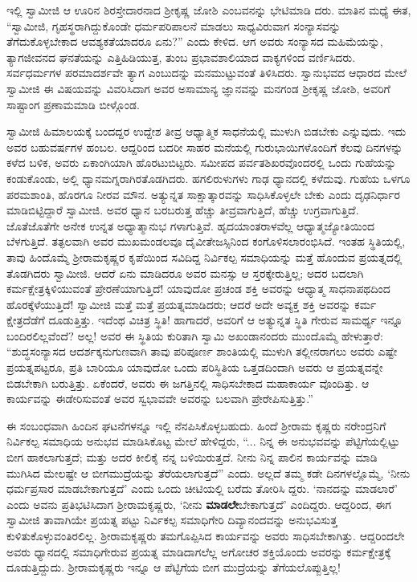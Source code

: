ಇಲ್ಲಿ ಸ್ವಾಮೀಜಿ ಆ ಊರಿನ ಶಿರಸ್ತೇದಾರನಾದ ಶ್ರೀಕೃಷ್ಣ ಜೋಶಿ ಎಂಬವನನ್ನು ಭೇಟಿಮಾಡಿ ದರು. ಮಾತಿನ ಮಧ್ಯೆ ಈತ, “ಸ್ವಾಮೀಜಿ, ಗೃಹಸ್ಥರಾಗಿದ್ದುಕೊಂಡೇ ಧರ್ಮಪರಿಪಾಲನೆ ಮಾಡಲು ಸಾಧ್ಯವಿರುವಾಗ ಸಂನ್ಯಾಸವನ್ನು ತೆಗೆದುಕೊಳ್ಳಬೇಕಾದ ಆವಶ್ಯಕತೆಯಾದರೂ ಏನು?” ಎಂದು ಕೇಳಿದ. ಆಗ ಅವರು ಸಂನ್ಯಾಸದ ಮಹಿಮೆಯನ್ನು, ತ್ಯಾಗಜೀವನದ ಘನತೆಯನ್ನು ಎತ್ತಿಹಿಡಿಯುತ್ತ, ತುಂಬ ಪ್ರಭಾವಶಾಲಿಯಾದ ವಾಕ್ಯಗಳಿಂದ ವರ್ಣಿಸಿದರು. ಸರ್ವಧರ್ಮಗಳ ಪರಮಾದರ್ಶವೇ ತ್ಯಾಗ ಎಂಬುದನ್ನು ಮನಮುಟ್ಟುವಂತೆ ತಿಳಿಸಿದರು. ಸ್ವಾನುಭವದ ಆಧಾರದ ಮೇಲೆ ಸ್ವಾಮೀಜಿ ಈ ವಿಷಯವನ್ನು ವಿವರಿಸಿದಾಗ ಅವರ ಅಸಾಮಾನ್ಯ ಜ್ಞಾನವನ್ನು ಮನಗಂಡ ಶ್ರೀಕೃಷ್ಣ ಜೋಶಿ, ಅವರಿಗೆ ಸಾಷ್ಟಾಂಗ ಪ್ರಣಾಮಮಾಡಿ ಬೀಳ್ಗೊಂಡ.

ಸ್ವಾಮೀಜಿ ಹಿಮಾಲಯಕ್ಕೆ ಬಂದದ್ದರ ಉದ್ದೇಶ ತೀವ್ರ ಆಧ್ಯಾತ್ಮಿಕ ಸಾಧನೆಯಲ್ಲಿ ಮುಳುಗಿ ಬಿಡಬೇಕು ಎನ್ನುವುದು. ಇದು ಅವರ ಬಹುವರ್ಷಗಳ ಹಂಬಲ. ಆದ್ದರಿಂದ ಬದರೀ ಸಾಹರ ಮನೆಯಲ್ಲಿ ಗುರುಭಾಯಿಗಳೊಂದಿಗೆ ಕೆಲವು ದಿನಗಳನ್ನು ಕಳೆದ ಬಳಿಕ, ಅವರು ಏಕಾಂಗಿಯಾಗಿ ಹೊರಟುಬಿಟ್ಟರು. ಸಮೀಪದ ಪರ್ವತಶಿಖರವೊಂದರಲ್ಲಿ ಒಂದು ಗುಹೆಯನ್ನು ಕಂಡುಕೊಂಡು, ಅಲ್ಲಿ ಧ್ಯಾನಮಗ್ನರಾಗಿರತೊಡಗಿದರು. ಹಗಲಿರುಳುಗಳು ಗಾಢ ಧ್ಯಾನದಲ್ಲಿ ಕಳೆದುವು. ಗುಹೆಯ ಒಳಗೂ ಪರಮಶಾಂತಿ, ಹೊರಗೂ ನೀರವ ಮೌನ. ಅತ್ಯುನ್ನತ ಸಾಕ್ಷಾತ್ಕಾರವನ್ನು ಸಾಧಿಸಿಕೊಳ್ಳಲೇ ಬೇಕು ಎಂದು ದೃಢನಿರ್ಧಾರ ಮಾಡಿಬಿಟ್ಟಿದ್ದಾರೆ ಸ್ವಾಮೀಜಿ. ಅವರ ಧ್ಯಾನ ಬರಬರುತ್ತ ಹೆಚ್ಚು ತೀವ್ರವಾಗುತ್ತಿದೆ, ಹೆಚ್ಚು ಉಗ್ರವಾಗುತ್ತಿದೆ. ಜೊತೆಜೊತೆಗೇ ಅನೇಕ ಉನ್ನತ ಅಧ್ಯಾತ್ಮಾನುಭ ಗಳಾಗುತ್ತಿವೆ. ಹೃದಯಾಂತರಾಳವೆಲ್ಲ ಆಧ್ಯಾತ್ಮಜ್ಯೋತಿಯಿಂದ ಬೆಳಗುತ್ತಿದೆ. ತತ್ಫಲವಾಗಿ ಅವರ ಮುಖಮಂಡಲವೂ ದೈವೀತೇಜಸ್ಸಿನಿಂದ ಕಂಗೊಳಿಸಲಾರಂಭಿಸಿದೆ. ಇಂತಹ ಸ್ಥಿತಿಯಲ್ಲಿ, ತಾವು ಹಿಂದೊಮ್ಮೆ ಶ್ರೀರಾಮಕೃಷ್ಣರ ಕೃಪೆಯಿಂದ ಸವಿದಿದ್ದ ನಿರ್ವಿಕಲ್ಪ ಸಮಾಧಿಯನ್ನು ಮತ್ತೆ ಹೊಂದುವ ಪ್ರಯತ್ನದಲ್ಲಿ ತೊಡಗಿದರು ಸ್ವಾಮೀಜಿ. ಆದರೆ ಏನು ಮಾಡಿದರೂ ಅವರ ಮನಸ್ಸು ಆ ಸ್ತರಕ್ಕೇರುತ್ತಿಲ್ಲ; ಅದರ ಬದಲಾಗಿ ಕರ್ಮಕ್ಷೇತ್ರಕ್ಕಿಳಿಯುವಂತೆ ಪ್ರೇರಣೆಯಾಗುತ್ತಿದೆ! ಯಾವುದೋ ಪ್ರಚಂಡ ಶಕ್ತಿ ಅವರನ್ನು ಆಧ್ಯಾತ್ಮ ಸಾಧನಾಪಥದಿಂದ ಹೊರಕ್ಕೆಳೆಯುತ್ತಿದೆ! ಸ್ವಾಮೀಜಿ ಮತ್ತೆ ಮತ್ತೆ ಪ್ರಯತ್ನಮಾಡಿದರು; ಆದರೆ ಅದೇ ಅವ್ಯಕ್ತ ಶಕ್ತಿ ಅವರನ್ನು ಕರ್ಮ ಕ್ಷೇತ್ರದೆಡೆಗೆ ದೂಡುತ್ತಿತ್ತು. ಇದೆಂಥ ವಿಚಿತ್ರ ಸ್ಥಿತಿ! ಹಾಗಾದರೆ, ಅವರಿಗೆ ಆ ಅತ್ಯುನ್ನತ ಸ್ಥಿತಿ ಗೇರುವ ಸಾಮರ್ಥ್ಯ ಇನ್ನೂ ಬಂದಿರಲಿಲ್ಲವೆಂದೆ? ಅಲ್ಲ! ಅವರ ಈ ಸ್ಥಿತಿಯ ಕುರಿತಾಗಿ ಸ್ವಾಮಿ ಅಖಂಡಾನಂದರು ಮುಂದೊಮ್ಮೆ ಹೇಳುತ್ತಾರೆ: “ಶುದ್ಧಸಂನ್ಯಾಸದ ಆದರ್ಶಕ್ಕನುಗುಣವಾಗಿ ತಾವು ಪರಿಪೂರ್ಣ ಶಾಂತಿಯಲ್ಲಿ ಮುಳುಗಿ ತಲ್ಲೀನರಾಗಲು ಅವರು ಎಷ್ಟೇ ಪ್ರಯತ್ನಪಟ್ಟರೂ, ಪ್ರತಿ ಬಾರಿಯೂ ಯಾವುದೋ ಒಂದು ಪರಿಸ್ಥಿತಿಯ ಒತ್ತಡದಿಂದಾಗಿ ಅವರು ಆ ಪ್ರಯತ್ನವನ್ನೇ ಬಿಡಬೇಕಾಗಿ ಬರುತ್ತಿತ್ತು. ಏಕೆಂದರೆ, ಅವರು ಈ ಜಗತ್ತಿನಲ್ಲಿ ಸಾಧಿಸಬೇಕಾದ ಮಹಾಕಾರ್ಯ ವೊಂದಿತ್ತು. ಆ ಕಾರ್ಯವನ್ನು ಈಡೇರಿಸುವಂತೆ ಅವರ ಸ್ವಭಾವವೇ ಅವರನ್ನು ಬಲವಾಗಿ ಪ್ರೇರೇಪಿಸುತ್ತಿತ್ತು.”

ಈ ಸಂಬಂಧವಾಗಿ ಹಿಂದಿನ ಘಟನೆಗಳನ್ನೂ ಇಲ್ಲಿ ನೆನಪಿಸಿಕೊಳ್ಳಬಹುದು. ಹಿಂದೆ ಶ್ರೀರಾಮ ಕೃಷ್ಣರು ನರೇಂದ್ರನಿಗೆ ನಿರ್ವಿಕಲ್ಪ ಸಮಾಧಿಯ ಅನುಭವ ಮಾಡಿಸಿಕೊಟ್ಟ ಮೇಲೆ ಹೇಳಿದ್ದರು, “... ನಿನ್ನ ಈ ಅನುಭವವನ್ನು ಪೆಟ್ಟಿಗೆಯಲ್ಲಿಟ್ಟು ಬೀಗ ಹಾಕಲಾಗುತ್ತದೆ; ಮತ್ತು ಅದರ ಕೀಲಿಕೈ ನನ್ನ ಬಳಿಯಿರುತ್ತದೆ. ನೀನು ನಿನ್ನ ಪಾಲಿನ ಕಾರ್ಯವನ್ನು ಮಾಡಿ ಮುಗಿಸಿದ ಮೇಲಷ್ಟೇ ಆ ಬೀಗಮುದ್ರೆಯನ್ನು ತೆರೆಯಲಾಗುತ್ತದೆ” ಎಂದು. ಅಲ್ಲದೆ ತಮ್ಮ ಕಡೇ ದಿನಗಳಲ್ಲೊಮ್ಮೆ, ‘ನೀನು ಧರ್ಮಪ್ರಸಾರ ಮಾಡಬೇಕಾಗುತ್ತದೆ’ ಎಂದು ಒಂದು ಚೀಟಿಯಲ್ಲಿ ಬರೆದು ತೋರಿಸಿ ದ್ದರು. ‘ನಾನದನ್ನು ಮಾಡಲಾರೆ’ ಎಂದು ಅವನು ಪ್ರತಿಭಟಿಸಿದಾಗ ಶ್ರೀರಾಮಕೃಷ್ಣರು, ‘ನೀನು \textbf{ಮಾಡಲೇ}ಬೇಕಾಗುತ್ತದೆ’ ಎಂದಿದ್ದರು. ಆದ್ದರಿಂದ, ಈಗ ಸ್ವಾಮೀಜಿ ತಾವಾಗಿಯೇ ಪ್ರಯತ್ನ ಪಟ್ಟು ನಿರ್ವಿಕಲ್ಪ ಸಮಾಧಿಗೇರಿ ದಿವ್ಯಾನಂದವನ್ನು ಅನುಭವಿಸುತ್ತ ಕುಳಿತುಕೊಳ್ಳುವಂತಿರಲಿಲ್ಲ. ಶ್ರೀರಾಮಕೃಷ್ಣರು ತಮಗೊಪ್ಪಿಸಿದ ಕಾರ್ಯವನ್ನು ಅವರು ಸಾಧಿಸಬೇಕಾಗಿತ್ತು. ಆದ್ದರಿಂದಲೇ ಅವರು ಧ್ಯಾನದಲ್ಲಿ ಸಮಾಧಿಗೇರುವ ಪ್ರಯತ್ನ ಮಾಡಿದಾಗಲೆಲ್ಲ ಅಗೋಚರ ಶಕ್ತಿಯೊಂದು ಅವರನ್ನು ಕರ್ಮಕ್ಷೇತ್ರಕ್ಕೆ ದೂಡುತ್ತಿದ್ದುದು. ಶ್ರೀರಾಮಕೃಷ್ಣರು ಇನ್ನೂ ಆ ಪೆಟ್ಟಿಗೆಯ ಬೀಗ ಮುದ್ರೆಯನ್ನು ತೆಗೆಯಲೊಪ್ಪುತ್ತಿಲ್ಲ!

